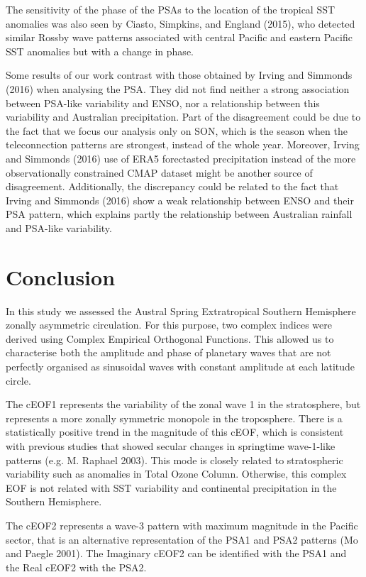 \documentclass[smallextended]{svjour3}       %
\begin{document}
The sensitivity of the phase of the PSAs to the location of the tropical SST anomalies was also seen by Ciasto, Simpkins, and England (2015), who detected similar Rossby wave patterns associated with central Pacific and eastern Pacific SST anomalies but with a change in phase.

Some results of our work contrast with those obtained by Irving and Simmonds (2016) when analysing the PSA.
They did not find neither a strong association between PSA-like variability and ENSO, nor a relationship between this variability and Australian precipitation.
Part of the disagreement could be due to the fact that we focus our analysis only on SON, which is the season when the teleconnection patterns are strongest, instead of the whole year.
Moreover, Irving and Simmonds (2016) use of ERA5 forectasted precipitation instead of the more observationally constrained CMAP dataset might be another source of disagreement.
Additionally, the discrepancy could be related to the fact that Irving and Simmonds (2016) show a weak relationship between ENSO and their PSA pattern, which explains partly the relationship between Australian rainfall and PSA-like variability.

\hypertarget{conclusion}{%
\section{Conclusion}\label{conclusion}}

In this study we assessed the Austral Spring Extratropical Southern Hemisphere zonally asymmetric circulation.
For this purpose, two complex indices were derived using Complex Empirical Orthogonal Functions.
This allowed us to characterise both the amplitude and phase of planetary waves that are not perfectly organised as sinusoidal waves with constant amplitude at each latitude circle.

The cEOF1 represents the variability of the zonal wave 1 in the stratosphere, but represents a more zonally symmetric monopole in the troposphere.
There is a statistically positive trend in the magnitude of this cEOF, which is consistent with previous studies that showed secular changes in springtime wave-1-like patterns (e.g. M. Raphael 2003).
This mode is closely related to stratospheric variability such as anomalies in Total Ozone Column.
Otherwise, this complex EOF is not related with SST variability and continental precipitation in the Southern Hemisphere.

The cEOF2 represents a wave-3 pattern with maximum magnitude in the Pacific sector, that is an alternative representation of the PSA1 and PSA2 patterns (Mo and Paegle 2001).
The Imaginary cEOF2 can be identified with the PSA1 and the Real cEOF2 with the PSA2.
\end{document}
